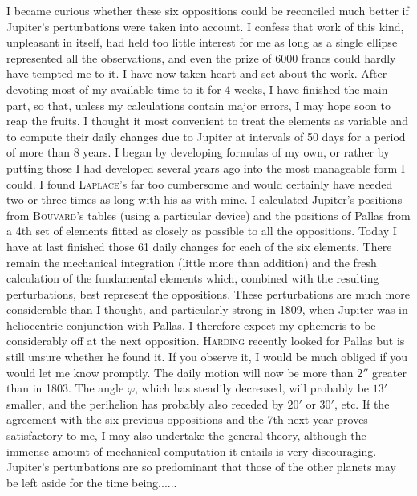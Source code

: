\noindent\hspace*{\parindent}I became curious whether these six oppositions could be reconciled much better if Jupiter's perturbations were taken into account. I confess that work of this kind, unpleasant in itself, had held too little interest for me as long as a single ellipse represented all the observations, and even the prize of 6000 francs could hardly have tempted me to it. I have now taken heart and set about the work. After devoting most of my available time to it for 4 weeks, I have finished the main part, so that, unless my calculations contain major errors, I may hope soon to reap the fruits. I thought it most convenient to treat the elements as variable and to compute their daily changes due to Jupiter at intervals of 50 days for a period of more than 8 years. I began by developing formulas of my own, or rather by putting those I had developed several years ago into the most manageable form I could. I found \textsc{Laplace}'s far too cumbersome and would certainly have needed two or three times as long with his as with mine. I calculated Jupiter's positions from \textsc{Bouvard}'s tables (using a particular device\HistoricalNoteDouble{See p. 475 of this volume.]}) and the positions of Pallas from a 4th set of elements fitted as closely as possible to all the oppositions. Today I have at last finished those 61 daily changes for each of the six elements. There remain the mechanical integration (little more than addition) and the fresh calculation of the fundamental elements which, combined with the resulting perturbations, best represent the oppositions. These perturbations are much more considerable than I thought, and particularly strong in 1809, when Jupiter was in heliocentric conjunction with Pallas. I therefore expect my ephemeris to be considerably off at the next opposition. \textsc{Harding} recently looked for Pallas but is still unsure whether he found it. If you observe it, I would be much obliged if you would let me know promptly. The daily motion will now be more than \(2''\) greater than in 1803. The angle \(\varphi\), which has steadily decreased, will probably be \(13'\) smaller, and the perihelion has probably also receded by \(20'\) or \(30'\), etc. If the agreement with the six previous oppositions and the 7th next year proves satisfactory to me, I may also undertake the general theory, although the immense amount of mechanical computation it entails is very discouraging. Jupiter's perturbations are so predominant that those of the other planets may be left aside for the time being.\quad.\quad.\quad.\quad.\quad.
